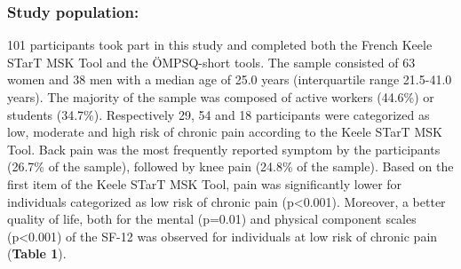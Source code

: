 \subsubsection{Study population: }
101 participants took part in this study and completed both the French Keele STarT MSK Tool and the ÖMPSQ-short tools. The sample consisted of 63 women and 38 men with a median age of 25.0 years (interquartile range 21.5-41.0 years). The majority of the sample was composed of active workers (44.6\%) or students (34.7\%). Respectively 29, 54 and 18 participants were categorized as low, moderate and high risk of chronic pain according to the Keele STarT MSK Tool. Back pain was the most frequently reported symptom by the participants (26.7\% of the sample), followed by knee pain (24.8\% of the sample). Based on the first item of the Keele STarT MSK Tool, pain was significantly lower for individuals categorized as low risk of chronic pain (p<0.001). Moreover, a better quality of life, both for the mental (p=0.01) and physical component scales (p<0.001) of the SF-12 was observed for individuals at low risk of chronic pain (\textbf{Table 1}). 


